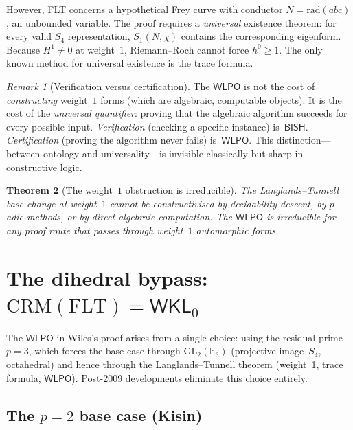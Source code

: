 \documentclass[11pt]{article}
\theoremstyle{plain}
\newtheorem{theorem}{Theorem}[section]
\theoremstyle{definition}
\theoremstyle{remark}
\newtheorem{remark}[theorem]{Remark}
\newcommand{\F}{\mathbb{F}}
\newcommand{\GL}{\mathrm{GL}}
\newcommand{\CRM}{\mathrm{CRM}}
\newcommand{\BISH}{\mathsf{BISH}}
\newcommand{\WLPO}{\mathsf{WLPO}}
\newcommand{\WKL}{\mathsf{WKL}_0}
\begin{document}
However, FLT concerns a hypothetical Frey curve with
conductor $N = \mathrm{rad}(abc)$, an unbounded variable.  The
proof requires a \emph{universal} existence theorem: for every
valid $S_4$ representation, $S_1(N,\chi)$ contains the
corresponding eigenform.  Because $H^1 \ne 0$ at weight~$1$,
Riemann--Roch cannot force $h^0 \ge 1$.  The only known method
for universal existence is the trace formula.

\begin{remark}[Verification versus certification]%
\label{rem:ontology}
The $\WLPO$ is not the cost of \emph{constructing} weight~$1$
forms (which are algebraic, computable objects).  It is the cost
of the \emph{universal quantifier}: proving that the algebraic
algorithm succeeds for every possible input.
\emph{Verification} (checking a specific instance) is~$\BISH$.
\emph{Certification} (proving the algorithm never fails)
is~$\WLPO$.  This distinction---between ontology and
universality---is invisible classically but sharp in
constructive logic.
\end{remark}

\begin{theorem}[The weight~$1$ obstruction is irreducible]%
\label{thm:weight1}
The Langlands--Tunnell base change at weight~$1$ cannot be
constructivised by decidability descent, by $p$-adic methods,
or by direct algebraic computation.  The $\WLPO$ is
irreducible for any proof route that passes through weight~$1$
automorphic forms.
\end{theorem}


\section{The dihedral bypass: \texorpdfstring{$\CRM(\mathrm{FLT}) = \WKL$}{CRM(FLT) = WKL}}%
\label{sec:bypass}

The $\WLPO$ in Wiles's proof arises from a single choice:
using the residual prime $p = 3$, which forces the base case
through $\GL_2(\F_3)$ (projective image~$S_4$, octahedral)
and hence through the Langlands--Tunnell theorem (weight~1,
trace formula, $\WLPO$).  Post-2009 developments eliminate
this choice entirely.

\subsection{The $p = 2$ base case (Kisin)}
\end{document}
